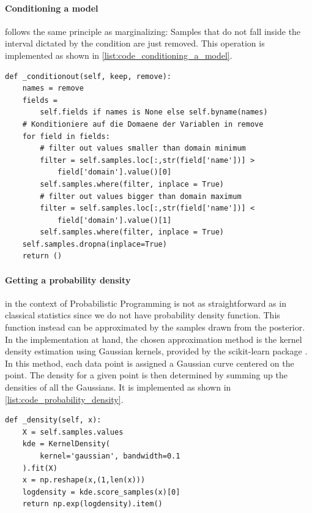 \documentclass{article}
\begin{document}
\paragraph{Conditioning a model} follows the same principle as marginalizing: Samples that do not fall inside the interval dictated by the condition are just removed. This operation is implemented as shown in \autoref{list:code_conditioning_a_model}.
\begin{lstlisting}[caption={Implementation of conditioning a model}, label={list:code_conditioning_a_model},captionpos=b]
def _conditionout(self, keep, remove):
    names = remove
    fields = 
        self.fields if names is None else self.byname(names)
    # Konditioniere auf die Domaene der Variablen in remove
    for field in fields:
        # filter out values smaller than domain minimum
        filter = self.samples.loc[:,str(field['name'])] > 
            field['domain'].value()[0]
        self.samples.where(filter, inplace = True)
        # filter out values bigger than domain maximum
        filter = self.samples.loc[:,str(field['name'])] < 
            field['domain'].value()[1]
        self.samples.where(filter, inplace = True)
    self.samples.dropna(inplace=True)
    return ()
\end{lstlisting}
\paragraph{Getting a probability density} in the context of Probabilistic Programming is not as straightforward as in classical statistics since we do not have probability density function. This function instead can be approximated by the samples drawn from the posterior. In the implementation at hand, the chosen approximation method is the kernel density estimation using Gaussian kernels, provided by the scikit-learn package \cite{scikit-learn}. In this method, each data point is assigned a Gaussian curve centered on the point. The density for a given point is then determined by summing up the densities of all the Gaussians. It is implemented as shown in \autoref{list:code_probability_density}.
\begin{lstlisting}[caption={Implementation of computing the probability density for a given point}, label={list:code_probability_density},captionpos=b]
def _density(self, x):
    X = self.samples.values
    kde = KernelDensity(
        kernel='gaussian', bandwidth=0.1
    ).fit(X)
    x = np.reshape(x,(1,len(x)))
    logdensity = kde.score_samples(x)[0]
    return np.exp(logdensity).item()
\end{lstlisting}
\end{document}
